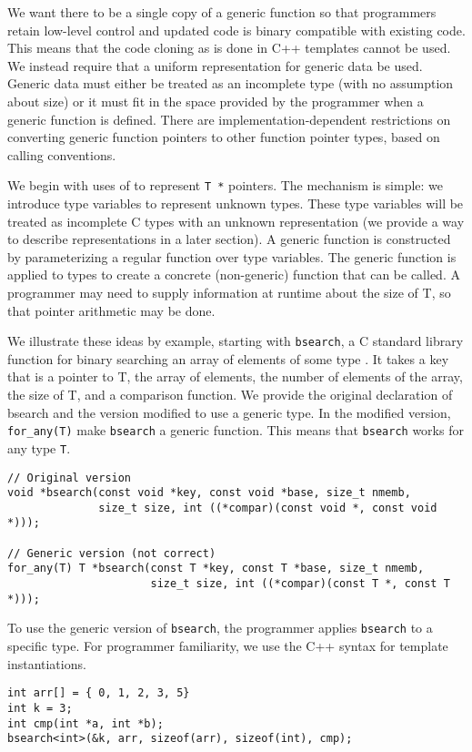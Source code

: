 We want there to be a single copy of a generic function so that programmers
retain low-level control and updated code is binary compatible with existing code.
This means that the code cloning as is done in C++ templates cannot be used.  
We instead require that a uniform representation for generic data be used.
Generic data must either be treated as an incomplete type (with no assumption
about size) or it must fit in the space provided by the programmer when
a generic function is defined. There are implementation-dependent restrictions 
on converting generic function pointers to  other function pointer types,
based on calling conventions.

We begin with uses of \uncheckedptrvoid{} to represent \lstinline+T *+ pointers.
The mechanism is simple: we introduce type variables to represent unknown types.
These type variables will be treated as incomplete C types with an unknown
representation (we provide a way to describe representations in a later
section).   A generic function is constructed by parameterizing a
regular function over type variables.  The generic function is applied
to types to create a concrete (non-generic) function that can be called.
A programmer may need to supply information at runtime about the size of T,
so that pointer arithmetic may be done.

We illustrate these ideas by example, starting with \lstinline+bsearch+, 
a C standard library function for binary
searching an array of elements of some type .  It
takes a key that is a pointer to T, the array of elements, the number of elements of
the array, the size of T, and a comparison function.  We provide the original declaration
of bsearch and the version modified to use a generic type.  In the modified version,
\lstinline+for_any(T)+ make \lstinline+bsearch+ a generic function.  This means that
\lstinline+bsearch+ works for any type \lstinline+T+.
\begin{lstlisting}
// Original version
void *bsearch(const void *key, const void *base, size_t nmemb, 
              size_t size, int ((*compar)(const void *, const void *)));

// Generic version (not correct)
for_any(T) T *bsearch(const T *key, const T *base, size_t nmemb,
                      size_t size, int ((*compar)(const T *, const T *)));
\end{lstlisting}
To use the generic version of \lstinline+bsearch+, the programmer applies \lstinline+bsearch+ to
a specific type.  For programmer familiarity, we use the C++ syntax for template
instantiations.
\begin{lstlisting}
int arr[] = { 0, 1, 2, 3, 5}
int k = 3;
int cmp(int *a, int *b);
bsearch<int>(&k, arr, sizeof(arr), sizeof(int), cmp);
\end{lstlisting}

